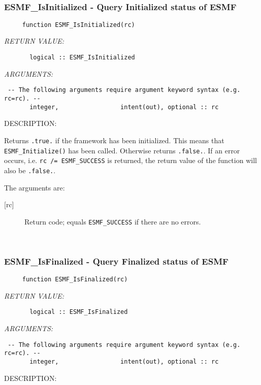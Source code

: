 \mbox{}\hrulefill\ 
 
\subsubsection [ESMF\_IsInitialized] {ESMF\_IsInitialized - Query Initialized status of ESMF}


  
\begin{verbatim}     function ESMF_IsInitialized(rc)\end{verbatim}{\em RETURN VALUE:}
\begin{verbatim}       logical :: ESMF_IsInitialized\end{verbatim}{\em ARGUMENTS:}
\begin{verbatim} -- The following arguments require argument keyword syntax (e.g. rc=rc). --
       integer,                 intent(out), optional :: rc
 \end{verbatim}
{\sf DESCRIPTION:\\ }


       Returns {\tt .true.} if the framework has been initialized. This means 
       that {\tt ESMF\_Initialize()} has been called. Otherwise returns
       {\tt .false.}. If an error occurs, i.e. {\tt rc /= ESMF\_SUCCESS} is 
       returned, the return value of the function will also be {\tt .false.}.
  
       The arguments are:
       \begin{description}
       \item [{[rc]}]
             Return code; equals {\tt ESMF\_SUCCESS} if there are no errors.
  
       \end{description} 
 
\mbox{}\hrulefill\ 
 
\subsubsection [ESMF\_IsFinalized] {ESMF\_IsFinalized - Query Finalized status of ESMF}


  
\begin{verbatim}     function ESMF_IsFinalized(rc)\end{verbatim}{\em RETURN VALUE:}
\begin{verbatim}       logical :: ESMF_IsFinalized\end{verbatim}{\em ARGUMENTS:}
\begin{verbatim} -- The following arguments require argument keyword syntax (e.g. rc=rc). --
       integer,                 intent(out), optional :: rc
 \end{verbatim}
{\sf DESCRIPTION:\\ }


